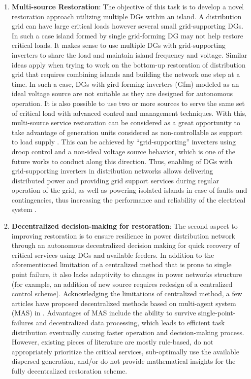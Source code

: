 \documentclass[12pt]{article}
\begin{document}
\begin{enumerate}
    \item \textbf{Multi-source Restoration}: The objective of this task is to develop a novel restoration approach utilizing multiple DGs within an island. A distribution grid can have large critical loads however several small grid-supporting DGs. In such a case island formed by single grid-forming DG may not help  restore critical  loads. It makes sense to use multiple DGs with grid-supporting inverters to share the load and maintain island frequency and voltage. Similar ideas apply when trying to work on the bottom-up restoration of distribution grid that requires combining islands and building the network one step at a time. In such a case, DGs with gird-forming inverters (Gfm) modeled as an ideal voltage source are not suitable as they are designed for autonomous operation. It is also possible to use two or more sources to serve the same set of critical load with advanced control and management techniques. With this, multi-source service restoration can be considered as a great opportunity to take advantage of generation units considered as non-controllable as support to load supply \cite{vinayagam2017pv}. This can be achieved by ``grid-supporting'' inverters using droop control and a non-ideal voltage source behavior, which is one of the future works to conduct along this direction. Thus, enabling of DGs with grid-supporting inverters in distribution networks allows delivering distributed power and providing grid support services during regular operation of the grid, as well as powering isolated islands in case of faults and contingencies, thus increasing the performance and reliability of the electrical system \cite{rocabert2012control}. 
    
    

    \item \textbf{Decentralized decision-making for restoration}: The second aspect to improving restoration is to ensure resilience in power distribution network through an autonomous decentralized decision making for quick recovery of critical services using DGs and available feeders. In addition to the aforementioned limitation of a centralized method that is prone to single point failure, it also lacks adaptivity to changes in power networks structure (for example, an addition of new source requires redesign of a centralized control scheme). Acknowledging the limitations of centralized method, a few articles have proposed decentralized methods based on multi-agent system (MAS) in \cite{nguyen2012agent, xu2011novel, zidan2012cooperative, ren2012conceptual, agrawal2015near}. Advantages of MAS include the ability to survive single-point-failures and decentralized data processing, which leads to efficient task distribution eventually causing faster operation and decision-making process. However, existing pieces of literature are mostly rule-based, do not appropriately prioritize the critical services, sub-optimally use the available dispersed generation, and/or do not provide mathematical insights for the fully decentralized restoration scheme. 
    

\end{enumerate}
\end{document}
